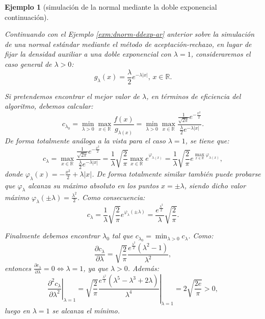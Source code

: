 \documentclass[
  spanish,
  10pt,
]{book}
\theoremstyle{break}
\newtheorem{example}{Ejemplo}[chapter]
\theoremstyle{nonumberplain}
\begin{document}
\begin{example}[simulación de la normal mediante la doble exponencial continuación]
\protect\hypertarget{exm:dnorm-ddexp-arb}{}\label{exm:dnorm-ddexp-arb}

Continuando con el Ejemplo \ref{exm:dnorm-ddexp-ar} anterior sobre la simulación de una normal estándar mediante el método de aceptación-rechazo, en lugar de fijar la densidad auxiliar a una doble exponencial con \(\lambda=1\), consideraremos el caso general de \(\lambda>0\):
\[g_{\lambda}(x)  = \frac{\lambda}{2}e^{-\lambda\left| x \right|} \text{, } x\in\mathbb{R}.\]

Si pretendemos encontrar el mejor valor de \(\lambda\), en términos de eficiencia del algoritmo, debemos calcular:
\[c_{\lambda_{0}} = \min_{\lambda>0}\max_{x\in\mathbb{R}}\frac{f(x)}{g_{\lambda(x)}}
=\min_{\lambda>0}\max_{x\in\mathbb{R}}\frac{\frac{1}{\sqrt{2\pi}}e^{-\frac{x^{2}}{2}}}{\frac{\lambda}{2}e^{-\lambda \left| x \right| }}.\]
De forma totalmente análoga a la vista para el caso \(\lambda=1\), se tiene que:
\[c_{\lambda}=\max_{x\in\mathbb{R}}\frac{\frac{1}{\sqrt{2\pi}}e^{-\frac{x^{2}}{2}}}{\frac{\lambda}{2}e^{-\lambda \left| x \right|  }}=\frac{1}{\lambda}\sqrt{\frac{2}{\pi}}\max_{x\in\mathbb{R}}e^{\varphi
_{\lambda(x)}}=\frac{1}{\lambda}\sqrt{\frac{2}{\pi}}e^{\max_{x\in\mathbb{R}}\varphi_{\lambda(x)} },\]
donde \(\varphi_{\lambda}(x)  =-\frac{x^{2}}{2}+\lambda\left| x \right|\).
De forma totalmente similar también puede probarse que \(\varphi_{\lambda}\) alcanza su máximo absoluto en los puntos \(x=\pm\lambda\), siendo dicho valor máximo
\(\varphi_{\lambda}\left( \pm\lambda \right) = \frac{\lambda^{2}}{2}\).
Como consecuencia:
\[c_{\lambda}=\frac{1}{\lambda}\sqrt{\frac{2}{\pi}}e^{\varphi_{\lambda}\left( \pm\lambda \right)} =\frac{e^{\frac{\lambda^{2}}{2}}}{\lambda}\sqrt{\frac{2}{\pi}}.\]

Finalmente debemos encontrar \(\lambda_{0}\) tal que \(c_{\lambda_{0}}=\min_{\lambda>0}c_{\lambda}\).
Como:
\[\frac{\partial c_{\lambda}}{\partial \lambda} =\sqrt{\frac{2}{\pi}}\frac{e^{\frac{\lambda^{2}}{2}}\left( \lambda^{2}-1\right)  }{\lambda^{2}},\]
entonces \(\frac{\partial c_{\lambda}}{\partial \lambda} = 0\Leftrightarrow\lambda=1\), ya que \(\lambda>0\).
Además:
\[\left. \frac{\partial ^{2}c_{\lambda}}{\partial \lambda^{2}}\right|_{\lambda=1} =\left.\sqrt{\frac
{2}{\pi}}\frac{e^{\frac{\lambda^{2}}{2}}\left(  \lambda^{5}-\lambda
^{3}+2\lambda\right)  }{\lambda^{4}}\right|_{\lambda=1}=2\sqrt{\frac{2e}{\pi}}>0,\]
luego en \(\lambda=1\) se alcanza el mínimo.


\end{example}
\end{document}

